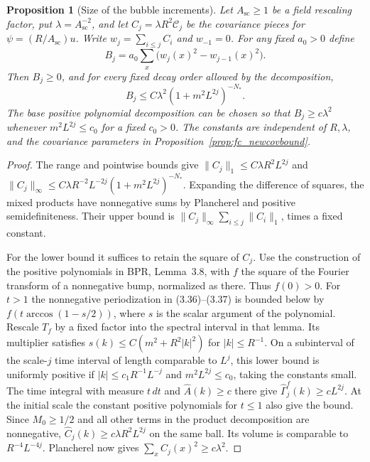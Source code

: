\documentclass[11pt]{article}
\newtheorem{proposition}{Proposition}[section]
\begin{document}
\begin{proposition}[Size of the bubble increments]\label{prop:fc_bubble}
Let \(A_{\mathrm{sc}}\ge1\) be a field rescaling factor, put
\(\lambda=A_{\mathrm{sc}}^{-2}\), and let
\(C_j=\lambda R^2\mathscr C_j\) be the covariance pieces for
\(\psi=(R/A_{\mathrm{sc}})u\). Write \(w_j=\sum_{i\le j}C_i\) and
\(w_{-1}=0\). For any fixed \(a_0>0\) define
\[
 B_j=a_0\sum_x \big(w_j(x)^2-w_{j-1}(x)^2\big).
\]
Then \(B_j\ge0\), and for every fixed decay order allowed by the
decomposition,
\[
 B_j\le C\lambda^2(1+m^2L^{2j})^{-N_*}.
\]
The base positive polynomial decomposition can be chosen so that
\(B_j\ge c\lambda^2\) whenever \(m^2L^{2j}\le c_0\) for a fixed
\(c_0>0\). The constants are independent of \(R,\lambda\), and the
covariance parameters in Proposition~\ref{prop:fc_newcovbound}.
\end{proposition}

\begin{proof}
The range and pointwise bounds give
\(\|C_j\|_1\le C\lambda R^2L^{2j}\) and
\(\|C_j\|_\infty\le C\lambda R^{-2}L^{-2j}(1+m^2L^{2j})^{-N_*}\).
Expanding the difference of squares, the mixed products have nonnegative
sums by Plancherel and positive semidefiniteness. Their upper bound is
\(\|C_j\|_\infty\sum_{i\le j}\|C_i\|_1\), times a fixed constant.

For the lower bound it suffices to retain the square of \(C_j\).
Use the construction of the positive polynomials in BPR, Lemma~3.8,
with \(f\) the square of the Fourier transform of a nonnegative bump,
normalized as there. Thus \(f(0)>0\). For \(t>1\) the nonnegative
periodization in (3.36)--(3.37) is bounded below by
\(f(t\arccos(1-s/2))\), where \(s\) is the scalar argument of the
polynomial. Rescale \(T_f\) by a fixed factor into the spectral
interval in that lemma. Its multiplier satisfies
\(s(k)\le C(m^2+R^2|k|^2)\) for \(|k|\le R^{-1}\). On a subinterval
of the scale-\(j\) time interval of length comparable to \(L^j\),
this lower bound is uniformly positive if
\(|k|\le c_1 R^{-1}L^{-j}\) and \(m^2L^{2j}\le c_0\), taking the
constants small. The time integral with measure \(t\,dt\) and
\(\widehat A(k)\ge c\) there give
\(\widehat\Gamma_j^f(k)\ge cL^{2j}\). At the initial scale the
constant positive polynomials for \(t\le1\) also give the bound.
Since \(M_0\ge1/2\) and all other terms in the product decomposition
are nonnegative, \(\widehat C_j(k)\ge c\lambda R^2 L^{2j}\) on
the same ball. Its volume is comparable to \(R^{-4}L^{-4j}\).
Plancherel now gives \(\sum_x C_j(x)^2\ge c\lambda^2\).
\end{proof}
\end{document}
